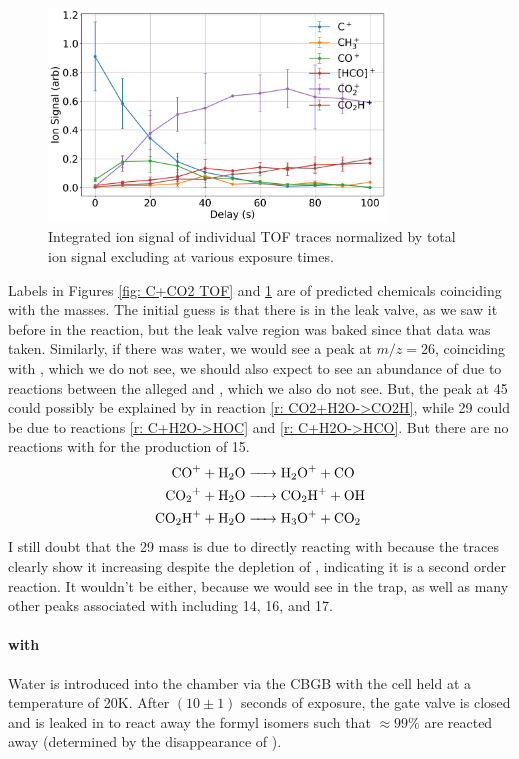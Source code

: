\begin{figure}
	\label{fig: C+CO2 traces}
	\centering
	\includegraphics[width=0.8\textwidth]{images/C_CO2_traces.png}
	\caption{Integrated ion signal of individual TOF traces normalized by total ion signal excluding  at various  exposure times.}
\end{figure}

Labels in Figures \ref{fig: C+CO2 TOF} and \ref{fig: C+CO2 traces} are of predicted chemicals coinciding with the masses. The initial guess is that there is  in the leak valve, as we saw it before in the  reaction, but the leak valve region was baked since that data was taken. Similarly, if there was water, we would see a peak at $m/z=26$, coinciding with , which we do not see, we should also expect to see an abundance of  due to reactions between the alleged \ce{[HCO]+} and , which we also do not see. But, the peak at 45 could possibly be explained by  in reaction \ref{r: CO2+H2O->CO2H}, while 29 could be due to reactions \ref{r: C+H2O->HOC} and \ref{r: C+H2O->HCO}. But there are no reactions with  for the production of 15.
\begin{align}
	\ce{CO+ + H2O & -> H2O+ + CO} \\
	\ce{CO2+ + H2O & -> CO2H+ + OH} \label{r: CO2+H2O->CO2H} \\
	\ce{CO2H+ + H2O & -> H3O+ + CO2}
\end{align}
I still doubt that the 29 mass is due to  directly reacting with  because the traces clearly show it increasing despite the depletion of , indicating it is a second order reaction. It wouldn't be  either, because we would see  in the trap, as well as many other peaks associated with  including 14, 16, and 17.

\paragraph{ with }
Water is introduced into the chamber via the CBGB with the cell held at a temperature of 20K. After $(10 \pm 1)$ seconds of exposure, the gate valve is closed and  is leaked in to react away the formyl isomers such that $\approx 99\%$ are reacted away (determined by the disappearance of ).

